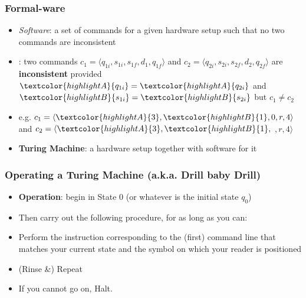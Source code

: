 \begin{frame}
\frametitle{Formal-ware}

\begin{itemize}[<+->]

\item \emph{Software}: a set of commands for a given hardware setup such that no two commands are inconsistent

\item {}: two commands $c_1 = \langle q_{1i}, s_{1i}, s_{1f}, d_1, q_{1f}\rangle$ and $c_2 = \langle q_{2i}, s_{2i}, s_{2f}, d_2, q_{2f}\rangle$ are \textbf{inconsistent} provided $\textcolor{highlightA}{q_{1i}} = \textcolor{highlightA}{q_{2i}}$ and $\textcolor{highlightB}{s_{1i}} = \textcolor{highlightB}{s_{2i}}$ but $c_1 \neq c_2$

\item[] e.g. $c_1 = \langle \textcolor{highlightA}{3}, \textcolor{highlightB}{1}, 0, r, 4\rangle$ and $c_2 = \langle \textcolor{highlightA}{3}, \textcolor{highlightB}{1}, $ $, r, 4\rangle$

\item \textbf{Turing Machine}: a hardware setup together with software for it 

\end{itemize}


\end{frame}

\begin{frame}
\frametitle{Operating a Turing Machine (a.k.a. Drill baby Drill)}

\begin{itemize}[<+->]

\item \textbf{Operation}: begin in State 0 (or whatever is the initial state $q_0$)

\item Then carry out the following procedure, for as long as you can:

\item Perform the instruction corresponding to the (first) command line that matches your current state and the symbol on which your reader is positioned

\item (Rinse \&) Repeat

\item If you cannot go on, Halt. 

\end{itemize}
\end{frame}

